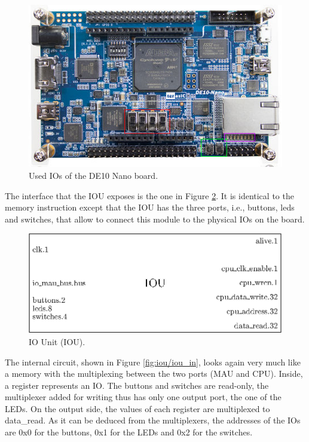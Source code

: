 \begin{figure}[H]
    \centering
    \includegraphics[scale=0.6]{Chapter3-CPU/res/ios.png}
    \caption{Used IOs of the DE10 Nano board.}
    \label{fig:iou/ios}
\end{figure}

The interface that the IOU exposes is the one in Figure \ref{fig:iou/iou}. It is identical to 
the memory instruction except that the IOU has the three ports, i.e., buttons, leds and switches, that 
allow to connect this module to the physical IOs on the board.

\begin{figure}[H]
    \centering
    \includegraphics[scale=0.8]{Chapter3-CPU/res/iou}
    \caption{IO Unit (IOU).}
    \label{fig:iou/iou}
\end{figure}

The internal circuit, shown in Figure \ref{fig:iou/iou_in}, looks again very 
much like a memory with the multiplexing between the two ports (MAU and CPU). Inside, a register 
represents an IO. The buttons and switches are read-only, the multiplexer added for writing thus has 
only one output port, the one of the LEDs. On the output side, the values of each register are 
multiplexed to data\_read. As it can be deduced from the multiplexers, the addresses of the IOs are 
0x0 for the buttons, 0x1 for the LEDs and 0x2 for the switches. 


